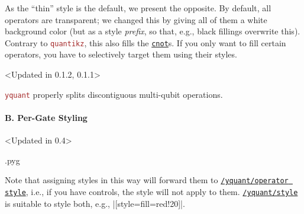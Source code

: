 \documentclass{scrartcl}
\makeatletter
\newenvironment{codeexample}{%
   \VerbatimEnvironment%
   \let\FVB@VerbatimOut\minted@FVB@VerbatimOut
   \let\FVE@VerbatimOut\minted@FVE@VerbatimOut
   \minted@configlang{tex}%
   \minted@fvset
   \begin{VerbatimOut}[codes={\catcode`\^^I=12},firstline,lastline]{\minted@jobname.pyg}%
}{
   \end{VerbatimOut}%
   \minted@langlinenoson%
   \savebox\codeexamplebox{ \minted@jobname.pyg}%
   \ifdim\wd\codeexamplebox>\dimexpr.5\linewidth-3mm\relax%
      \wd\codeexamplebox=.5\linewidth%
   \else%
      \wd\codeexamplebox=\dimexpr\wd\codeexamplebox+3mm\relax%
   \fi%
   \noindent\begin{minipage}{\wd\codeexamplebox}%
      \centering%
      \usebox\codeexamplebox%
   \end{minipage}%
   \begin{minipage}{\dimexpr\linewidth-\wd\codeexamplebox\relax}%
      \expandafter\minted@pygmentize\expandafter{\minted@lang}%
   \end{minipage}%
   \minted@langlinenosoff%
   \par%
}
\newenvironment{codeexample*}{%
   \VerbatimEnvironment%
   \let\FVB@VerbatimOut\minted@FVB@VerbatimOut
   \let\FVE@VerbatimOut\minted@FVE@VerbatimOut
   \minted@configlang{tex}%
   \minted@fvset
   \begin{VerbatimOut}[codes={\catcode`\^^I=12},firstline,lastline]{\minted@jobname.pyg}%
}{
   \end{VerbatimOut}%
   \minted@langlinenoson%
   \begin{adjustbox}{center}
       \minted@jobname.pyg %
   \end{adjustbox}\nopagebreak
   \expandafter\minted@pygmentize\expandafter{\minted@lang}%
   \minted@langlinenosoff%
   \par%
}
\def\pkg#1{\textcolor{brown}{\texttt{#1}}}
\def\gate#1{\hyperref[gate:#1]{\texttt{#1}}}
\def\style#1{\hyperref[style:#1]{\texttt{#1}}}
\def\Yquant{\pkg{yquant}}
\makeatother
\begin{document}
               \begin{example}
                  \begin{codeexample*}
                  \end{codeexample*}
                  As the ``thin'' style is the default, we present the opposite.
                  By default, all operators are transparent; we changed this by giving all of them a white background color (but as a style \emph{prefix}, so that, e.g., black fillings overwrite this).
                  Contrary to \pkg{quantikz}, this also fills the \gate{cnot}s.
                  If you only want to fill certain operators, you have to selectively target them using their styles.
               \end{example}

               \begin{example}<Updated in 0.1.2, 0.1.1>
                  \begin{codeexample*}
                  \end{codeexample*}
                  \Yquant{} properly splits discontiguous multi\hyp qubit operations.
               \end{example}

            \paragraph{B. Per-Gate Styling}\leavevmode
               \begin{example}<Updated in 0.4>
                  \begin{codeexample}
                  \end{codeexample}
                  Note that assigning styles in this way will forward them to \style{/yquant/operator style}, i.e., if you have controls, the style will not apply to them.
                  \style{/yquant/style} is suitable to style both, e.g., \tex|[style={fill=red!20}]|.
               \end{example}
\end{document}
